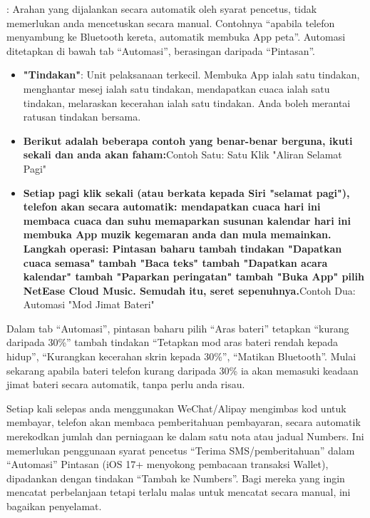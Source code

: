 
: Arahan yang dijalankan secara automatik oleh syarat pencetus, tidak memerlukan anda mencetuskan secara manual. Contohnya “apabila telefon menyambung ke Bluetooth kereta, automatik membuka App peta”. Automasi ditetapkan di bawah tab “Automasi”, berasingan daripada “Pintasan”.

\begin{itemize}
  \item \textbf{"Tindakan"}: Unit pelaksanaan terkecil. Membuka App ialah satu tindakan, menghantar mesej ialah satu tindakan, mendapatkan cuaca ialah satu tindakan, melaraskan kecerahan ialah satu tindakan. Anda boleh merantai ratusan tindakan bersama.
  \item \textbf{Berikut adalah beberapa contoh yang benar-benar berguna, ikuti sekali dan anda akan faham:}Contoh Satu: Satu Klik "Aliran Selamat Pagi"
  \item \textbf{Setiap pagi klik sekali (atau berkata kepada Siri "selamat pagi"), telefon akan secara automatik: mendapatkan cuaca hari ini membaca cuaca dan suhu memaparkan susunan kalendar hari ini membuka App muzik kegemaran anda dan mula memainkan. Langkah operasi: Pintasan baharu tambah tindakan "Dapatkan cuaca semasa" tambah "Baca teks" tambah "Dapatkan acara kalendar" tambah "Paparkan peringatan" tambah "Buka App" pilih NetEase Cloud Music. Semudah itu, seret sepenuhnya.}Contoh Dua: Automasi "Mod Jimat Bateri"
\end{itemize}

Dalam tab “Automasi”, pintasan baharu pilih “Aras bateri” tetapkan “kurang daripada 30\%” tambah tindakan “Tetapkan mod aras bateri rendah kepada hidup”, “Kurangkan kecerahan skrin kepada 30\%”, “Matikan Bluetooth”. Mulai sekarang apabila bateri telefon kurang daripada 30\% ia akan memasuki keadaan jimat bateri secara automatik, tanpa perlu anda risau.


Setiap kali selepas anda menggunakan WeChat/Alipay mengimbas kod untuk membayar, telefon akan membaca pemberitahuan pembayaran, secara automatik merekodkan jumlah dan perniagaan ke dalam satu nota atau jadual Numbers. Ini memerlukan penggunaan syarat pencetus “Terima SMS/pemberitahuan” dalam “Automasi” Pintasan (iOS 17+ menyokong pembacaan transaksi Wallet), dipadankan dengan tindakan “Tambah ke Numbers”. Bagi mereka yang ingin mencatat perbelanjaan tetapi terlalu malas untuk mencatat secara manual, ini bagaikan penyelamat.


